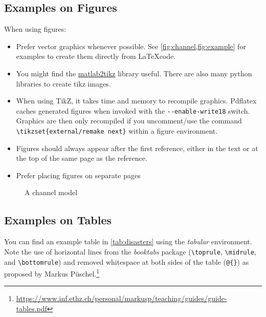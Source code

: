 \subsection{Examples on Figures}

\sloppy
When using figures:
\begin{itemize}
	\item Prefer vector graphics whenever possible. See \cref{fig:channel,fig:example}
		for examples to create them directly from \LaTeX code.
	\item You might find the \href{https://github.com/matlab2tikz/matlab2tikz}{matlab2tikz}
		library useful. There are also many python libraries to create tikz images.
	\item When using TikZ, it takes time and memory to recompile graphics. Pdflatex
		caches generated figures when invoked with the \lstinline|--enable-write18| switch.
		Graphics are then only recompiled if you uncomment/use the command
	\lstinline|\tikzset{external/remake next}| within a figure environment.
	\item Figures should always appear after the first reference, either in the text
		or at the top of the same page as the reference.
	\item Prefer placing figures on separate pages
\end{itemize}


\begin{figure}
	\centering
	
	\caption[Communication Channel]{A channel model}
	\label{fig:channel}
\end{figure}

\subsection{Examples on Tables}

You can find an example table in \cref{tab:disasters} using the \emph{tabular} environment.
Note the use of horizontal lines from the \emph{booktabs} package
(\lstinline|\toprule|, \lstinline|\midrule|, and \lstinline|\bottomrule|) and removed
whitespace at both sides of the table (\lstinline|@{}|) as proposed by Markus
Püschel.\footnote{\url{https://www.inf.ethz.ch/personal/markusp/teaching/guides/guide-tables.pdf}}

